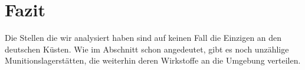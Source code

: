 
\chapter[Fazit]{Fazit}

Die Stellen die wir analysiert haben sind auf keinen Fall die Einzigen 
an den deutschen Küsten. Wie im Abschnitt  schon 
angedeutet, gibt es noch unzählige Munitionslagerstätten, die weiterhin
deren Wirkstoffe an die Umgebung verteilen.
